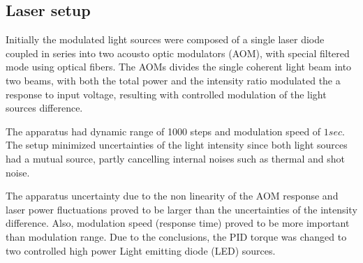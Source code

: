 \documentclass[\main/master.tex]{subfiles}
\begin{document}
\subsection{Laser setup}
Initially the modulated light sources were composed of a single laser diode coupled in series into two acousto optic modulators (AOM), with special filtered mode using optical fibers. The AOMs divides the single coherent light beam into two beams, with both the total power and the intensity ratio modulated the a response to input voltage, resulting with controlled modulation of the light sources difference.
\par\noindent
The apparatus had dynamic range of 1000 steps and modulation speed of $1 sec$. The setup minimized uncertainties of the light intensity since both light sources had a mutual source, partly cancelling internal noises such as thermal and shot noise. 
\par\noindent
The apparatus uncertainty due to the non linearity of the AOM response and laser power fluctuations proved to be larger than the uncertainties of the intensity difference. Also, modulation speed (response time) proved to be more important than modulation range. Due to the conclusions, the PID torque was changed to two controlled high power Light emitting diode (LED) sources.
\end{document}
